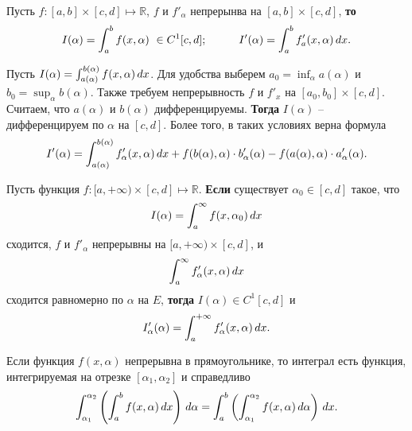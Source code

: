 \begin{to_con}
    Пусть $f \colon  [a, b] \times  [c, d] \mapsto \mathbb{R}$, $f$ и $f'_\alpha$ непрерынва на $[a, b] \times  [c, d]$, \textbf{то}
    \begin{equation*}
        I(\alpha) = \int_a^b f(x, \alpha) \ \in C^1 [c, d];
        \hspace{10 mm}
        I'(\alpha) = \int_a^b f'_a (x, \alpha) \d x.
    \end{equation*}
\end{to_con}

\begin{to_con}
    Пусть $I(\alpha) = \int_{a(\alpha)}^{b(\alpha)} f(x, \alpha) \, d x$. 
    Для удобства выберем $a_0 = \inf_\alpha a(\alpha)$ и $b_0 = \sup_\alpha b(\alpha)$. 
    Также требуем непрерывность $f$ и $f'_x$ на $[a_0, b_0] \times [c, d]$. Считаем, что $a(\alpha)$ и $b(\alpha)$ дифференцируемы. \textbf{Тогда} $I(\alpha)$ -- дифференцируем по $\alpha$ на $[c, d]$. 
    Более того, в таких условиях верна формула
    \begin{equation*}
        I'(\alpha) = \int_{a(\alpha)}^{b(\alpha)} f'_\alpha (x, \alpha) \, d x + f(b(\alpha), \alpha) \cdot b'_\alpha (\alpha) - f(a(\alpha), \alpha) \cdot a'_\alpha (\alpha).
    \end{equation*}
\end{to_con}


\begin{to_con}
    Пусть функция $f\colon [a, +\infty) \times [c, d] \mapsto \mathbb{R}$. \textbf{Если} существует $\alpha_0 \in [c, d]$ такое, что
    \begin{equation*}
        I(\alpha) = \int_a^{\infty} f(x, \alpha_0) \, d x
    \end{equation*}
    сходится, $f$ и $f'_\alpha$ непрерывны на $[a, +\infty) \times [c, d]$, и
    \begin{equation*}
        \int_a^{\infty} f'_\alpha (x, \alpha) \, d x
    \end{equation*}
    сходится равномерно по $\alpha$ на $E$, \textbf{тогда} $I(\alpha) \in C^1 [c, d]$  и 
    \begin{equation*}
        I'_\alpha (\alpha) = \int_{a}^{+\infty} f'_\alpha (x, \alpha) \, d x.
    \end{equation*}
\end{to_con}


\begin{to_thr}
    Если функция $f(x, \alpha)$ непрерывна в прямоугольнике, то интеграл есть функция, интегрируемая на отрезке $[\alpha_1, \alpha_2]$ и справедливо
    \begin{equation*}
        \int_{\alpha_1}^{\alpha_2} \left(
            \int_a^b f(x ,\alpha) \, d x
        \right) \, d \alpha 
        =
        \int_a^b \left(
            \int_{\alpha_1}^{\alpha_2} f(x, \alpha) \, d \alpha
        \right) \, d x.
    \end{equation*}
\end{to_thr}


